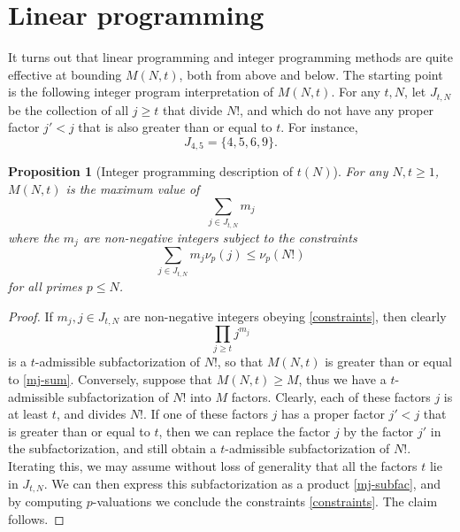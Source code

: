 \documentclass[10pt,a4paper,reqno]{amsart}
\numberwithin{equation}{section}
\theoremstyle{plain}
\newtheorem{proposition}[proposition]{Proposition}
\theoremstyle{definition}
\begin{document}
\begin{table}[htp!]
\caption{For sample values of $N \in [10^5, 10^9]$, the performance of the fast greedy algorithm (using heuristically chosen $t\in [t_0(N),t_1(N)]$), and the standard greedy algorithm (using  exhaustively computed $t_1(N)$), compared against the lower bound $t(N)_-$ obtained from the linear programming method of . All computations were performed on an Intel i9-13900KS CPU with 24 cores. The fast heuristic computations were single-threaded computations, while exhaustive greedy computations used 32 threads running on 24 cores.}\label{greedy-table}
\end{table}

\section{Linear programming}\label{linprog-sec}

It turns out that linear programming and integer programming methods are quite effective at bounding $M(N,t)$, both from above and below.  The starting point is the following integer program interpretation of $M(N,t)$. For any $t,N$, let $J_{t,N}$ be the collection of all $j \geq t$ that divide $N!$, and which do not have any proper factor $j' < j$ that is also greater than or equal to $t$.  For instance,
$$ J_{4,5} = \{ 4, 5, 6, 9 \}.$$

\begin{proposition}[Integer programming description of $t(N)$]\label{fip}  For any $N,t \geq 1$, $M(N,t)$ is the maximum value of
\begin{equation}\label{mj-sum}
   \sum_{j \in J_{t,N}} m_j
\end{equation}
where the $m_j$ are non-negative integers subject to the constraints
\begin{equation}\label{constraints}
  \sum_{j \in J_{t,N}} m_j \nu_p(j) \leq \nu_p(N!)
\end{equation}
for all primes $p \leq N$.
\end{proposition}

\begin{proof}  If $m_j, j \in J_{t,N}$ are non-negative integers obeying \eqref{constraints}, then clearly
  \begin{equation}\label{mj-subfac}
    \prod_{j \geq t} j^{m_j}
  \end{equation}
is a $t$-admissible subfactorization of $N!$, so that $M(N,t)$ is greater than or equal to \eqref{mj-sum}. Conversely, suppose that $M(N,t) \geq M$, thus we have a $t$-admissible subfactorization of $N!$ into $M$ factors.  Clearly, each of these factors $j$ is at least $t$, and divides $N!$.
If one of these factors $j$ has a proper factor $j' < j$ that is greater than or equal to $t$, then we can replace the factor $j$ by the factor $j'$ in the subfactorization, and still obtain a $t$-admissible subfactorization of $N!$.  Iterating this, we may assume without loss of generality that all the factors $t$ lie in $J_{t,N}$.  We can then express this subfactorization as a product \eqref{mj-subfac}, and by computing $p$-valuations we conclude the constraints \eqref{constraints}.  The claim follows.
\end{proof}
\end{document}
